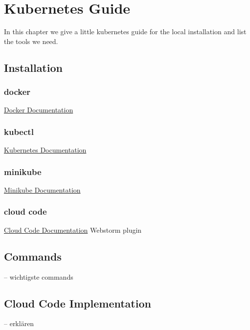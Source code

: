 \chapter{Kubernetes Guide}

In this chapter we give a little kubernetes guide for the local installation and list the tools we need.
\section{Installation}
\subsection{docker}
\href{https://docs.docker.com/get-docker/}{Docker Documentation}

\subsection{kubectl}
\href{https://kubernetes.io/docs/tasks/tools/#kubectl}{Kubernetes Documentation}

\subsection{minikube}
\href{https://minikube.sigs.k8s.io/docs/start/}{Minikube Documentation}

\subsection{cloud code}
\href{https://plugins.jetbrains.com/plugin/8079-cloud-code/}{Cloud Code Documentation}
Webstorm plugin

\section{Commands}
-- wichtigste commands

\section{Cloud Code Implementation}
-- erklären